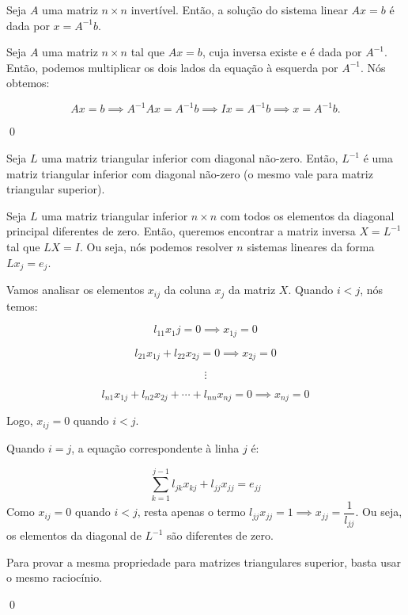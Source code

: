 \begin{Proposition}[Solução do Sistema Linear $Ax = b$]
	Seja $A$ uma matriz $n\times n$ invertível. Então, a solução do sistema linear $Ax = b$ é dada por $x = A^{-1}b$.
\end{Proposition}

\begin{Proof}
	Seja $A$ uma matriz $n\times n$ tal que $Ax = b$, cuja inversa existe e é dada por $A^{-1}$. Então, podemos multiplicar os dois lados da equação à esquerda por $A^{-1}$. Nós obtemos:
	
	$$
	Ax = b \implies A^{-1}Ax = A^{-1}b \implies Ix = A^{-1}b \implies x = A^{-1}b.
	$$
	
	\qed
\end{Proof}

\begin{Proposition}
	Seja $L$ uma matriz triangular inferior com diagonal não-zero. Então, $L^{-1}$ é uma matriz triangular inferior com diagonal não-zero (o mesmo vale para matriz triangular superior).
\end{Proposition}

\begin{Proof}
	Seja $L$ uma matriz triangular inferior $n\times n$ com todos os elementos da diagonal principal diferentes de zero. Então, queremos encontrar a matriz inversa $X = L^{-1}$ tal que $LX = I$. Ou seja, nós podemos resolver $n$ sistemas lineares da forma $Lx_j = e_j$.
	
	Vamos analisar os elementos $x_{ij}$ da coluna $x_j$ da matriz $X$. Quando $i < j$, nós temos:
	
	$$
	l_{11}x_1j = 0 \implies x_{1j} = 0
	$$
	
	$$
	l_{21}x_{1j} + l_{22}x_{2j} = 0 \implies x_{2j} = 0
	$$
	
	$$
	\vdots
	$$
	
	$$
	l_{n1}x_{1j} + l_{n2}x_{2j} + \cdots + l_{nn}x_{nj} = 0 \implies x_{nj} = 0
	$$
	
	Logo, $x_{ij} = 0$ quando $i < j$.
	
	Quando $i = j$, a equação correspondente à linha $j$ é:
	
	$$
	\sum\limits_{k = 1}^{j - 1} l_{jk}x_{kj} + l_{jj}x_{jj} = e_{jj}
	$$
	Como $x_{ij} = 0$ quando $i < j$, resta apenas o termo $l_{jj}x_{jj} = 1 \implies x_{jj} = \dfrac{1}{l_{jj}}$. Ou seja, os elementos da diagonal de $L^{-1}$ são diferentes de zero.
	
	Para provar a mesma propriedade para matrizes triangulares superior, basta usar o mesmo raciocínio.
	
	\qed
\end{Proof}

